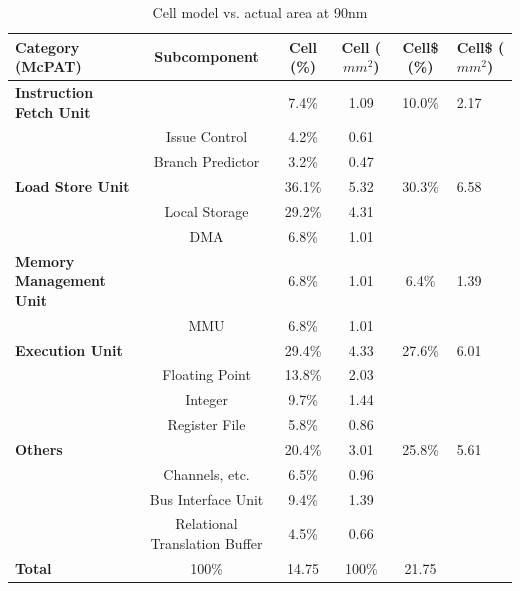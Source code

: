 \documentclass{sig-alternate-05-2015}
\begin{document}
\begin{table}[t]
\centering
\begin{tabular}{| l | c | c | c | c | l |} \hline
\textbf{Category (McPAT)} & \textbf{Subcomponent} & \textbf{Cell (\%)} & \textbf{Cell ($mm^2$)} & \textbf{Cell\$ (\%)} & \textbf{Cell\$ ($mm^2$) }\\ \hline
\textbf{Instruction Fetch Unit}  & &  7.4\% & 1.09 & 10.0\% & 2.17 \\ \hline
  & Issue Control & 4.2\% & 0.61 & & \\ \hline
  & Branch Predictor & 3.2\% & 0.47  & & \\ \hline
\textbf{Load Store Unit}  & & 36.1\%  & 5.32 & 30.3\% & 6.58 \\ \hline
  & Local Storage & 29.2\% & 4.31 & & \\ \hline
  & DMA & 6.8\% & 1.01  & & \\ \hline  
\textbf{Memory Management Unit} &  & 6.8\% & 1.01 & 6.4\% & 1.39 \\ \hline
 &  MMU & 6.8\% & 1.01   & & \\ \hline  
\textbf{Execution Unit}  & & 29.4\% & 4.33 & 27.6\% & 6.01  \\ \hline
 & Floating Point & 13.8\% & 2.03      & & \\ \hline  
 &  Integer & 9.7\% & 1.44      & & \\ \hline  
 & Register File & 5.8\%  & 0.86      & & \\ \hline  
\textbf{Others} &  & 20.4\% & 3.01 & 25.8\% & 5.61  \\ \hline
 & Channels, etc. & 6.5\% & 0.96      & & \\ \hline  
 & Bus Interface Unit  & 9.4\%  & 1.39      & & \\ \hline  
 & Relational Translation Buffer & 4.5\% & 0.66      & & \\ \hline  
\textbf{Total}  & 100\%  & 14.75 & 100\% & 21.75   \\ \hline
\end{tabular}
\label{table:spe_area}
\caption{Cell model vs. actual area at 90nm}
\end{table}
\end{document}
